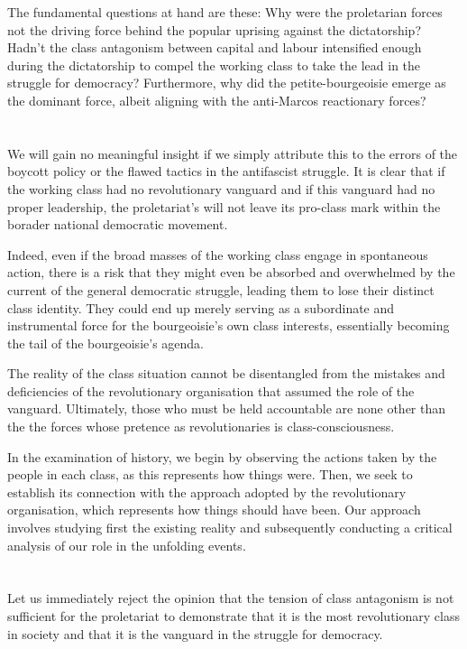 The fundamental questions at hand are these:
Why were the proletarian forces 
not the driving force 
behind the popular uprising against the dictatorship? 
Hadn't the class antagonism between capital and labour 
intensified enough during the dictatorship 
to compel the working class 
to take the lead in the struggle for democracy? 
Furthermore, 
why did the petite-bourgeoisie emerge as the dominant force, 
albeit aligning with the anti-Marcos reactionary forces?


\section{}
We will gain no meaningful insight
if we simply attribute this 
to the errors of the boycott policy 
or the flawed tactics in the antifascist struggle. 
It is clear that if the working class had no revolutionary vanguard 
and if this vanguard had no proper leadership,
the proletariat's will not leave its pro-class mark
within the borader national democratic movement.

Indeed, 
even if the broad masses of the working class 
engage in spontaneous action, 
there is a risk that they might even
be absorbed and overwhelmed by 
the current of the general democratic struggle, 
leading them to lose their distinct class identity. 
They could end up merely serving 
as a subordinate and instrumental force 
for the bourgeoisie's own class interests, 
essentially becoming the tail of the bourgeoisie's agenda.

The reality of the class situation 
cannot be disentangled from 
the mistakes and deficiencies 
of the revolutionary organisation 
that assumed the role of the vanguard. 
Ultimately, 
those who must be held accountable are none other than the
the forces whose pretence as revolutionaries is class-consciousness.

In the examination of history,
we begin by observing the actions taken by the people in each class,
as this represents how things were.
Then, we seek to establish its connection
with the approach adopted by the revolutionary organisation,
which represents how things should have been.
Our approach involves studying first the existing reality 
and subsequently conducting a critical analysis 
of our role in the unfolding events.


\section{}
Let us immediately reject the opinion 
that the tension of class antagonism is not sufficient for the proletariat 
to demonstrate that it is the most revolutionary class in society 
and that it is the vanguard in the struggle for democracy.

